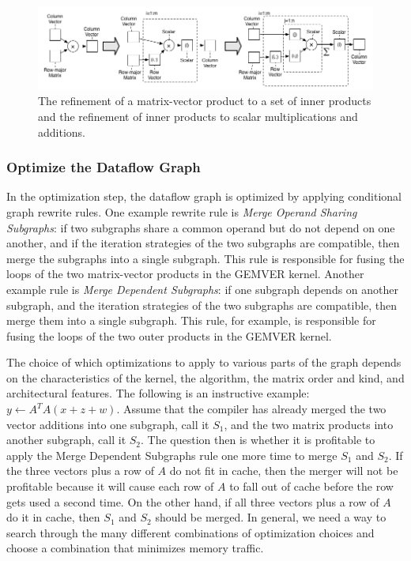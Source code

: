 \documentclass[11pt]{article}
\begin{document}
\begin{figure}[hbtp]
  \centering
  \includegraphics[width=\textwidth]{figures/refine-mv-dot.png}

  \caption{The refinement of a matrix-vector product to a set of inner products and the refinement of inner products to scalar multiplications and additions.}
  \label{fig:refine-mv-dot}
\end{figure}




\subsubsection{Optimize the Dataflow Graph}

In the optimization step, the dataflow graph is optimized by applying conditional graph rewrite rules.  One example rewrite rule is \emph{Merge Operand Sharing Subgraphs}: if two subgraphs share a common operand but do not depend on one another, and if the iteration strategies of the two subgraphs are compatible, then merge the subgraphs into a single subgraph.  This rule is responsible for fusing the loops of the two matrix-vector products in the GEMVER kernel.  Another example rule is \emph{Merge Dependent Subgraphs}: if one subgraph depends on another subgraph, and the iteration strategies of the two subgraphs are compatible, then merge them into a single subgraph.  This rule, for example, is responsible for fusing the loops of the two outer products in the GEMVER kernel.

The choice of which optimizations to apply to various parts of the graph depends on the characteristics of the kernel, the algorithm, the matrix order and kind, and architectural features.  The following is an instructive example: $y \gets A^T A (x + z + w)$.  Assume that the compiler has already merged the two vector additions into one subgraph, call it $S_1$, and the two matrix products into another subgraph, call it $S_2$. The question then is whether it is profitable to apply the Merge Dependent Subgraphs rule one more time to merge $S_1$ and $S_2$. If the three vectors plus a row of $A$ do not fit in cache, then the merger will not be profitable because it will cause each row of $A$ to fall out of cache before the row gets used a second time.  On the other hand, if all three vectors plus a row of $A$ do it in cache, then $S_1$ and $S_2$ should be merged.  In general, we need a way to search through the many different combinations of optimization choices and choose a combination that minimizes memory traffic.
\end{document}
